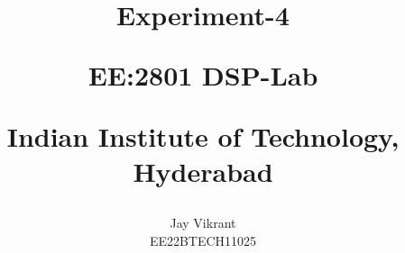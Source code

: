 \documentclass[journal,12pt,onecolumn]{IEEEtran}
\theoremstyle{remark}
\begin{document}
%




\vspace{3cm}

\title{
Experiment-4 

\large{EE:2801 DSP-Lab}

Indian Institute of Technology, Hyderabad
}
\author{Jay Vikrant

EE22BTECH11025
}	


%
%
%

% 
%



% 
\end{document}
